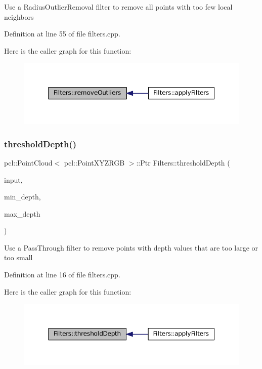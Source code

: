 Use a Radius\+Outlier\+Removal filter to remove all points with too few local neighbors 

Definition at line 55 of file filters.\+cpp.

Here is the caller graph for this function\+:
\nopagebreak
\begin{figure}[H]
\begin{center}
\leavevmode
\includegraphics[width=350pt]{class_filters_aade8ae78e3f5490db23213b8fc63215b_icgraph}
\end{center}
\end{figure}
\hypertarget{class_filters_afc0f89a25b158ea0c11025f60fbd9afb}{}\label{class_filters_afc0f89a25b158ea0c11025f60fbd9afb} 
\subsubsection{\texorpdfstring{threshold\+Depth()}{thresholdDepth()}}
{\footnotesize\ttfamily pcl\+::\+Point\+Cloud$<$ pcl\+::\+Point\+X\+Y\+Z\+R\+GB $>$\+::Ptr Filters\+::threshold\+Depth (\begin{DoxyParamCaption}\item[{const pcl\+::\+Point\+Cloud$<$ pcl\+::\+Point\+X\+Y\+Z\+R\+GB $>$\+::Ptr \&}]{input,  }\item[{float}]{min\+\_\+depth,  }\item[{float}]{max\+\_\+depth }\end{DoxyParamCaption})}

Use a Pass\+Through filter to remove points with depth values that are too large or too small 

Definition at line 16 of file filters.\+cpp.

Here is the caller graph for this function\+:
\nopagebreak
\begin{figure}[H]
\begin{center}
\leavevmode
\includegraphics[width=350pt]{class_filters_afc0f89a25b158ea0c11025f60fbd9afb_icgraph}
\end{center}
\end{figure}
\hypertarget{class_filters_a0435083e1ecca7c1a3d8883f241c4225}{}\label{class_filters_a0435083e1ecca7c1a3d8883f241c4225} 
